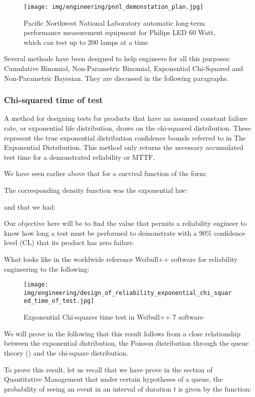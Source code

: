 	 \begin{figure}[H]
		\centering
		\texttt{[image: img/engineering/pnnl\_demonstation\_plan.jpg]}
		\caption{Pacific Northwest National Laboratory automatic long-term performance measurement equipment for  Philips LED 60 Watt, which can test up to $200$ lamps at a time}
	\end{figure}
	Several methods have been designed to help engineers for all this purposes: Cumulative Binomial, Non-Parametric Binomial, Exponential Chi-Squared and Non-Parametric Bayesian. They are discussed in the following paragraphs.
	
	\subsubsection{Chi-squared time of test}
	A method for designing tests for products that have an assumed constant failure rate, or exponential life distribution, draws on the chi-squared distribution. These represent the true exponential distribution confidence bounds referred to in The Exponential Distribution. This method only returns the necessary accumulated test time for a demonstrated reliability or $\overline{\text{MTTF}}$.
	
	We have seen earlier above that for a survival function of the form:
	
	The corresponding density function was the exponential law:
	
 	and that we had:
	
 	Our objective here will be to find the value that permits a reliability engineer to know how long a test must be performed to demonstrate with a $90\%$ confidence level (CL) that its product has zero failure.

	What looks like in the worldwide reference Weibull++ software for reliability engineering to the following:
	\begin{figure}[H]
		\centering
		\texttt{[image: img/engineering/design\_of\_reliability\_exponential\_chi\_squared\_time\_of\_test.jpg]}
		\caption{Exponential Chi-squares time test in Weibull++ 7 software}
	\end{figure}
	We will prove in the following that this result follows from a close relationship between the exponential distribution, the Poisson distribution through the queue theory () and the chi-square distribution.

	To prove this result, let us recall that we have prove in the section of Quantitative Management that under certain hypotheses of a queue, the probability of seeing an event in an interval of duration $t$ is given by the function:
	
